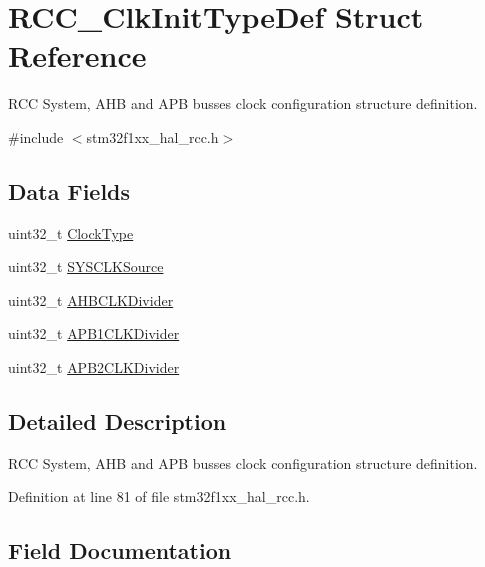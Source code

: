 \hypertarget{struct_r_c_c___clk_init_type_def}{}\section{R\+C\+C\+\_\+\+Clk\+Init\+Type\+Def Struct Reference}
\label{struct_r_c_c___clk_init_type_def}


R\+CC System, A\+HB and A\+PB busses clock configuration structure definition.  




{\ttfamily \#include $<$stm32f1xx\+\_\+hal\+\_\+rcc.\+h$>$}

\subsection*{Data Fields}
\begin{DoxyCompactItemize}
\item 
uint32\+\_\+t \hyperlink{struct_r_c_c___clk_init_type_def_afe92b105bff8e698233c286bb3018384}{Clock\+Type}
\item 
uint32\+\_\+t \hyperlink{struct_r_c_c___clk_init_type_def_a02b70c23b593a55814d887f483ea0871}{S\+Y\+S\+C\+L\+K\+Source}
\item 
uint32\+\_\+t \hyperlink{struct_r_c_c___clk_init_type_def_a082c91ea9f270509aca7ae6ec42c2a54}{A\+H\+B\+C\+L\+K\+Divider}
\item 
uint32\+\_\+t \hyperlink{struct_r_c_c___clk_init_type_def_a994aca51c40decfc340e045da1a6ca19}{A\+P\+B1\+C\+L\+K\+Divider}
\item 
uint32\+\_\+t \hyperlink{struct_r_c_c___clk_init_type_def_a9bbc30e9f4ddf462bc1fa6ea273eb4db}{A\+P\+B2\+C\+L\+K\+Divider}
\end{DoxyCompactItemize}


\subsection{Detailed Description}
R\+CC System, A\+HB and A\+PB busses clock configuration structure definition. 

Definition at line 81 of file stm32f1xx\+\_\+hal\+\_\+rcc.\+h.



\subsection{Field Documentation}
\mbox{\label{struct_r_c_c___clk_init_type_def_a082c91ea9f270509aca7ae6ec42c2a54}} 
